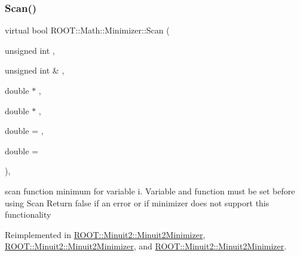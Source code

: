 \mbox{\label{classROOT_1_1Math_1_1Minimizer_a1e6e4b32d7338a7a08791cff67f54080}} 
\subsubsection{\texorpdfstring{Scan()}{Scan()}\hspace{0.1cm}{\footnotesize\ttfamily [2/3]}}
{\footnotesize\ttfamily virtual bool R\+O\+O\+T\+::\+Math\+::\+Minimizer\+::\+Scan (\begin{DoxyParamCaption}\item[{unsigned int}]{,  }\item[{unsigned int \&}]{,  }\item[{double $\ast$}]{,  }\item[{double $\ast$}]{,  }\item[{double}]{ = {},  }\item[{double}]{ = {} }\end{DoxyParamCaption})\hspace{0.3cm}{\ttfamily [inline]}, {\ttfamily [virtual]}}

scan function minimum for variable i. Variable and function must be set before using Scan Return false if an error or if minimizer does not support this functionality 

Reimplemented in \mbox{\hyperlink{classROOT_1_1Minuit2_1_1Minuit2Minimizer_a3f2f94c743a9b120a71da5ba23bd88cb}{R\+O\+O\+T\+::\+Minuit2\+::\+Minuit2\+Minimizer}}, \mbox{\hyperlink{classROOT_1_1Minuit2_1_1Minuit2Minimizer_a3f2f94c743a9b120a71da5ba23bd88cb}{R\+O\+O\+T\+::\+Minuit2\+::\+Minuit2\+Minimizer}}, and \mbox{\hyperlink{classROOT_1_1Minuit2_1_1Minuit2Minimizer_a3f2f94c743a9b120a71da5ba23bd88cb}{R\+O\+O\+T\+::\+Minuit2\+::\+Minuit2\+Minimizer}}.

\mbox{\label{classROOT_1_1Math_1_1Minimizer_a1e6e4b32d7338a7a08791cff67f54080}} 
